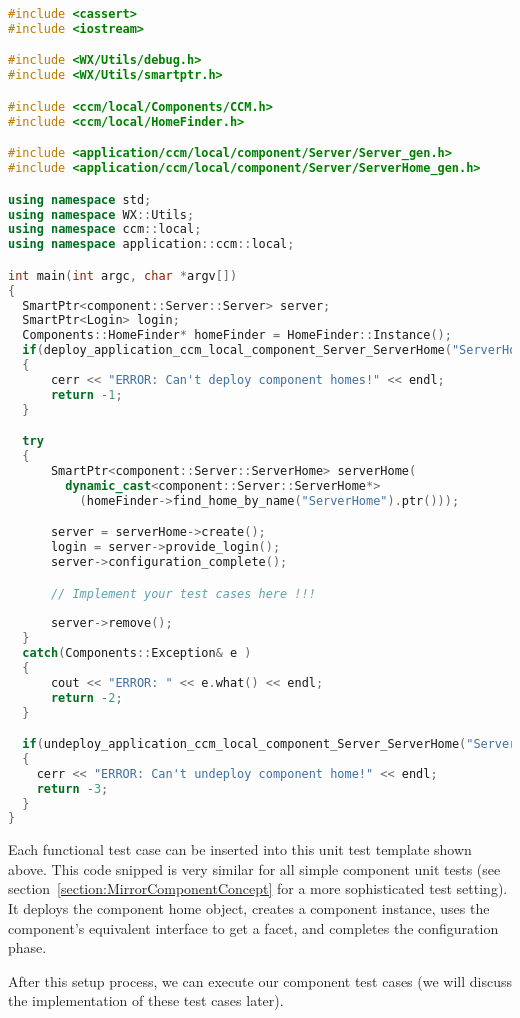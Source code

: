 \begin{footnotesize} 
\begin{lstlisting}[language=C++]
#include <cassert>
#include <iostream>

#include <WX/Utils/debug.h>
#include <WX/Utils/smartptr.h>

#include <ccm/local/Components/CCM.h>
#include <ccm/local/HomeFinder.h>

#include <application/ccm/local/component/Server/Server_gen.h>
#include <application/ccm/local/component/Server/ServerHome_gen.h>

using namespace std;
using namespace WX::Utils;
using namespace ccm::local;
using namespace application::ccm::local;

int main(int argc, char *argv[])
{
  SmartPtr<component::Server::Server> server;
  SmartPtr<Login> login;
  Components::HomeFinder* homeFinder = HomeFinder::Instance();
  if(deploy_application_ccm_local_component_Server_ServerHome("ServerHome")) 
  {
      cerr << "ERROR: Can't deploy component homes!" << endl;
      return -1;
  }

  try 
  {
      SmartPtr<component::Server::ServerHome> serverHome(
        dynamic_cast<component::Server::ServerHome*>
          (homeFinder->find_home_by_name("ServerHome").ptr()));

      server = serverHome->create();
      login = server->provide_login();
      server->configuration_complete();

      // Implement your test cases here !!!
    
      server->remove();
  } 
  catch(Components::Exception& e ) 
  {
      cout << "ERROR: " << e.what() << endl;
      return -2;
  } 

  if(undeploy_application_ccm_local_component_Server_ServerHome("ServerHome")) 
  {
    cerr << "ERROR: Can't undeploy component home!" << endl;
    return -3;
  }
}
\end{lstlisting}
\end{footnotesize}

Each functional test case can be inserted into this unit test template shown above.
This code snipped is very similar for all simple component unit tests 
(see section~\ref{section:MirrorComponentConcept} for a more sophisticated test
setting).
It deploys the component home object, creates a component instance, uses 
the component's equivalent interface to get a facet, and completes the
configuration phase. 

\vspace{3mm}
After this setup process, we can execute our component test cases (we will
discuss the implementation of these test cases later).

